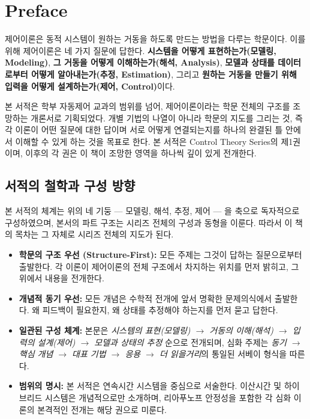 \chapter*{Preface} \label{sec:preface}
    제어이론은 동적 시스템이 원하는 거동을 하도록 만드는 방법을 다루는 학문이다. 이를 위해 제어이론은 네 가지 질문에 답한다. \textbf{시스템을 어떻게 표현하는가(모델링, Modeling)}, \textbf{그 거동을 어떻게 이해하는가(해석, Analysis)}, \textbf{모델과 상태를 데이터로부터 어떻게 알아내는가(추정, Estimation)}, 그리고 \textbf{원하는 거동을 만들기 위해 입력을 어떻게 설계하는가(제어, Control)}이다.

    본 서적은 학부 자동제어 교과의 범위를 넘어, 제어이론이라는 학문 전체의 구조를 조망하는 개론서로 기획되었다. 개별 기법의 나열이 아니라 학문의 지도를 그리는 것, 즉 각 이론이 어떤 질문에 대한 답이며 서로 어떻게 연결되는지를 하나의 완결된 틀 안에서 이해할 수 있게 하는 것을 목표로 한다. 본 서적은 Control Theory Series의 제1권이며, 이후의 각 권은 이 책이 조망한 영역을 하나씩 깊이 있게 전개한다.

    \section*{서적의 철학과 구성 방향}
        본 서적의 체계는 위의 네 기둥 — 모델링, 해석, 추정, 제어 — 을 축으로 독자적으로 구성하였으며, 본서의 파트 구조는 시리즈 전체의 구성과 동형을 이룬다. 따라서 이 책의 목차는 그 자체로 시리즈 전체의 지도가 된다.

        \begin{itemize}[leftmargin=*]
            \item \textbf{학문의 구조 우선 (Structure-First):} 모든 주제는 그것이 답하는 질문으로부터 출발한다. 각 이론이 제어이론의 전체 구조에서 차지하는 위치를 먼저 밝히고, 그 위에서 내용을 전개한다.
            \item \textbf{개념적 동기 우선:} 모든 개념은 수학적 전개에 앞서 명확한 문제의식에서 출발한다. 왜 피드백이 필요한지, 왜 상태를 추정해야 하는지를 먼저 묻고 답한다.
            \item \textbf{일관된 구성 체계:} 본문은 \textit{시스템의 표현(모델링) $\rightarrow$ 거동의 이해(해석) $\rightarrow$ 입력의 설계(제어) $\rightarrow$ 모델과 상태의 추정} 순으로 전개되며, 심화 주제는 \textit{동기 $\rightarrow$ 핵심 개념 $\rightarrow$ 대표 기법 $\rightarrow$ 응용 $\rightarrow$ 더 읽을거리}의 통일된 서베이 형식을 따른다.
            \item \textbf{범위의 명시:} 본 서적은 연속시간 시스템을 중심으로 서술한다. 이산시간 및 하이브리드 시스템은 개념적으로만 소개하며, 리아푸노프 안정성을 포함한 각 심화 이론의 본격적인 전개는 해당 권으로 미룬다.
        \end{itemize}

